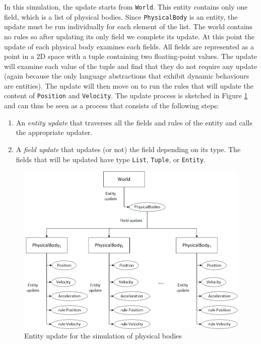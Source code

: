 \noindent
In this simulation, the update starts from \texttt{World}. This entity contains only one field, which is a list of physical bodies. Since \texttt{PhysicalBody} is an entity, the update must be run individually for each element of the list. The world contains no rules so after updating its only field we complete its update. At this point the update of each physical body examines each fields. All fields are represented as a point in a 2D space with a tuple containing two floating-point values. The update will examine each value of the tuple and find that they do not require any update (again because the only language abstractions that exhibit dynamic behaviours are entities). The update will then move on to run the rules that will update the content of \texttt{Position} and \texttt{Velocity}. The update process is sketched in Figure \ref{fig:ch_networking_simulation_update} and can thus be seen as a process that consists of the following steps:

\begin{enumerate}[noitemsep]
	\item An \textit{entity update} that traverses all the fields and rules of the entity and calls the appropriate updater.
	\item A \textit{field update} that updates (or not) the field depending on its type. The fields that will be updated have type \texttt{List}, \texttt{Tuple}, or \texttt{Entity}.
\end{enumerate}

\begin{figure}
	\centering
	\includegraphics[width=\textwidth]{Figures/chapter_networking/update_traversal}
	\caption{Entity update for the simulation of physical bodies}
	\label{fig:ch_networking_simulation_update}
\end{figure}

